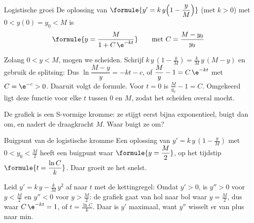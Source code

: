 \begin{theorie}
\begin{stelling}{Logistische groei}
De oplossing van $\formule{y' = k\,y \Bigl(1 - \dfrac{y}{M}\Bigr)}$ (met $k > 0$) met $0 < y(0) = y_0 < M$ is
\[
\formule{y = \frac{M}{1 + C\,\e^{-kt}}} \qquad \text{met } C = \frac{M - y_0}{y_0}
\]
\end{stelling}

\begin{bewijs}
Zolang $0 < y < M$, mogen we scheiden. Schrijf $k\,y\,(1 - \tfrac yM) = \tfrac kM\,y\,(M - y)$ en gebruik de splitsing:
Dus $\ln\dfrac{M - y}{y} = -kt - c$, of $\dfrac{M}{y} - 1 = C\,\e^{-kt}$ met $C = \e^{-c} > 0$. Daaruit volgt de formule. Voor $t = 0$ is $\tfrac{M}{y_0} - 1 = C$. Omgekeerd ligt deze functie voor elke $t$ tussen 0 en $M$, zodat het scheiden overal mocht.
\end{bewijs}
\end{theorie}

De grafiek is een S-vormige kromme: ze stijgt eerst bijna exponentieel, buigt dan om, en nadert de draagkracht $M$. Waar buigt ze om?

\begin{theorie}
\begin{stelling}{Buigpunt van de logistische kromme}
Een oplossing van $y' = k\,y\,(1 - \tfrac yM)$ met $0 < y_0 < \tfrac M2$ heeft een buigpunt waar $\formule{y = \dfrac M2}$, op het tijdstip $\formule{t = \dfrac{\ln C}{k}}$. Daar groeit ze het snelst.
\end{stelling}

\begin{bewijs}
Leid $y' = k\,y - \tfrac kM\,y^2$ af naar $t$ met de kettingregel:
Omdat $y' > 0$, is $y'' > 0$ voor $y < \tfrac M2$ en $y'' < 0$ voor $y > \tfrac M2$: de grafiek gaat van hol naar bol waar $y = \tfrac M2$, dus waar $C\,\e^{-kt} = 1$, of $t = \tfrac{\ln C}{k}$. Daar is $y'$ maximaal, want $y''$ wisselt er van plus naar min.
\end{bewijs}
\end{theorie}

